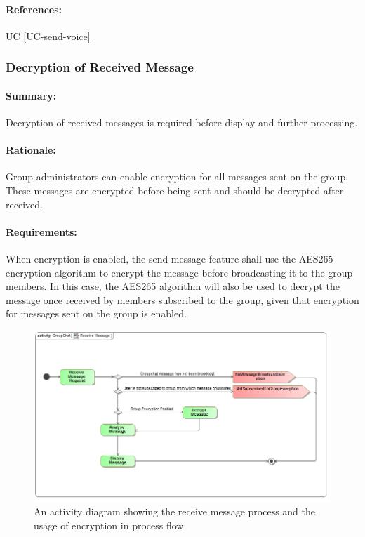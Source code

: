 \documentclass[11pt]{article}
\begin{document}
\paragraph{References:} UC \ref{UC-send-voice}

\subsubsection{Decryption of Received Message} \label{FR-decrypt-received-message}
\paragraph{Summary:} Decryption of received messages is required before display and further processing.
\paragraph{Rationale:} Group administrators can enable encryption for all messages sent on the group. These messages are encrypted before being sent and should be decrypted after received.
\paragraph{Requirements:} When encryption is enabled, the send message feature shall use the AES265 encryption algorithm to encrypt the message before broadcasting it to the group members. In this case, the AES265 algorithm will also be used to decrypt the message once received by members subscribed to the group, given that encryption for messages sent on the group is enabled.
\begin{figure}[H]
\centering
\includegraphics[width=5in]{./images/Activity_Receive_Message.png}
\caption[Receive Message Activity Diagram]{An activity diagram showing the receive message process and the  usage of encryption in process flow.}
\label{FR-figure-activity-receive-message}
\end{figure}
\end{document}
